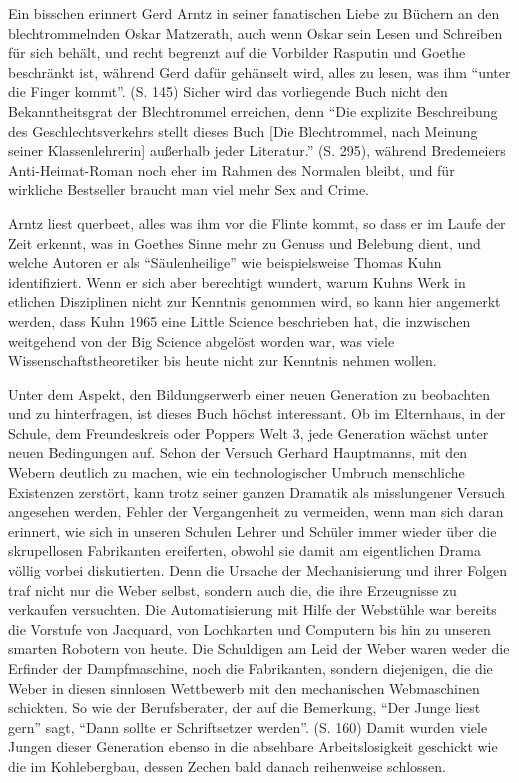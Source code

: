 \documentclass[a4paper,
fontsize=11pt,
oneside,
numbers=noperiodatend,
parskip=half-,
bibliography=totoc,
final
]{scrartcl}
\begin{document}
Ein bisschen erinnert Gerd Arntz in seiner fanatischen Liebe zu Büchern
an den blechtrommelnden Oskar Matzerath, auch wenn Oskar sein Lesen und
Schreiben für sich behält, und recht begrenzt auf die Vorbilder Rasputin
und Goethe beschränkt ist, während Gerd dafür gehänselt wird, alles zu
lesen, was ihm \enquote{unter die Finger kommt}. (S. 145) Sicher wird
das vorliegende Buch nicht den Bekanntheitsgrat der Blechtrommel
erreichen, denn \enquote{Die explizite Beschreibung des
Geschlechtsverkehrs stellt dieses Buch {[}Die Blechtrommel, nach Meinung
seiner Klassenlehrerin{]} außerhalb jeder Literatur.} (S. 295), während
Bredemeiers Anti-Heimat-Roman noch eher im Rahmen des Normalen bleibt,
und für wirkliche Bestseller braucht man viel mehr Sex and Crime.~

Arntz liest querbeet, alles was ihm vor die Flinte kommt, so dass er im
Laufe der Zeit erkennt, was in Goethes Sinne mehr zu Genuss und Belebung
dient, und welche Autoren er als \enquote{Säulenheilige} wie
beispielsweise Thomas Kuhn identifiziert. Wenn er sich aber berechtigt
wundert, warum Kuhns Werk in etlichen Disziplinen nicht zur Kenntnis
genommen wird, so kann hier angemerkt werden, dass Kuhn 1965 eine Little
Science beschrieben hat, die inzwischen weitgehend von der Big Science
abgelöst worden war, was viele Wissenschaftstheoretiker bis heute nicht
zur Kenntnis nehmen wollen.

Unter dem Aspekt, den Bildungserwerb einer neuen Generation zu
beobachten und zu hinterfragen, ist dieses Buch höchst interessant. Ob
im Elternhaus, in der Schule, dem Freundeskreis oder Poppers Welt 3,
jede Generation wächst unter neuen Bedingungen auf. Schon der Versuch
Gerhard Hauptmanns, mit den Webern deutlich zu machen, wie ein
technologischer Umbruch menschliche Existenzen zerstört, kann trotz
seiner ganzen Dramatik als misslungener Versuch angesehen werden, Fehler
der Vergangenheit zu vermeiden, wenn man sich daran erinnert, wie sich
in unseren Schulen Lehrer und Schüler immer wieder über die skrupellosen
Fabrikanten ereiferten, obwohl sie damit am eigentlichen Drama völlig
vorbei diskutierten. Denn die Ursache der Mechanisierung und ihrer
Folgen traf nicht nur die Weber selbst, sondern auch die, die ihre
Erzeugnisse zu verkaufen versuchten. Die Automatisierung mit Hilfe der
Webstühle war bereits die Vorstufe von Jacquard, von Lochkarten und
Computern bis hin zu unseren smarten Robotern von heute. Die Schuldigen
am Leid der Weber waren weder die Erfinder der Dampfmaschine, noch die
Fabrikanten, sondern diejenigen, die die Weber in diesen sinnlosen
Wettbewerb mit den mechanischen Webmaschinen schickten. So wie der
Berufsberater, der auf die Bemerkung, \enquote{Der Junge liest gern}
sagt, \enquote{Dann sollte er Schriftsetzer werden}. (S. 160) Damit
wurden viele Jungen dieser Generation ebenso in die absehbare
Arbeitslosigkeit geschickt wie die im Kohlebergbau, dessen Zechen bald
danach reihenweise schlossen.~
\end{document}
